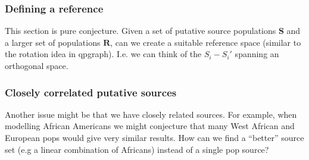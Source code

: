 \documentclass[12pt,fullpage, a4paper]{article}
\newcommand{\MS}{\mathbf{S}} %
\newcommand{\MR}{\mathbf{R}} %
\begin{document}
\subsubsection{Defining a reference}
This section is pure conjecture. Given a set of putative source populations $\MS$ and a larger set of populations $\MR$, can we create a suitable reference space (similar to the rotation idea in qpgraph). I.e. we can think of the $S_i - S_i'$ spanning an orthogonal space.

\subsubsection{Closely correlated putative sources}
Another issue might be that we have closely related sources. For example, when modelling African Americans we might conjecture that many West African and European pops would give very similar results. How can we find a ``better'' source set (e.g a linear combination of Africans) instead of a single pop source?


\newpage
%
\printbibliography
	
\end{document}
